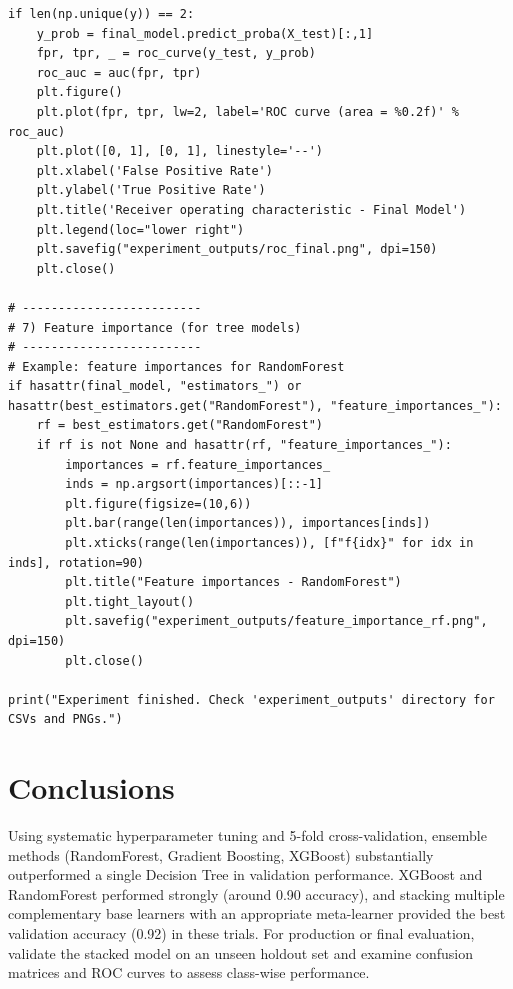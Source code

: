 \documentclass[11pt]{article}
\begin{document}
\begin{lstlisting}
if len(np.unique(y)) == 2:
    y_prob = final_model.predict_proba(X_test)[:,1]
    fpr, tpr, _ = roc_curve(y_test, y_prob)
    roc_auc = auc(fpr, tpr)
    plt.figure()
    plt.plot(fpr, tpr, lw=2, label='ROC curve (area = %0.2f)' % roc_auc)
    plt.plot([0, 1], [0, 1], linestyle='--')
    plt.xlabel('False Positive Rate')
    plt.ylabel('True Positive Rate')
    plt.title('Receiver operating characteristic - Final Model')
    plt.legend(loc="lower right")
    plt.savefig("experiment_outputs/roc_final.png", dpi=150)
    plt.close()

# -------------------------
# 7) Feature importance (for tree models)
# -------------------------
# Example: feature importances for RandomForest
if hasattr(final_model, "estimators_") or hasattr(best_estimators.get("RandomForest"), "feature_importances_"):
    rf = best_estimators.get("RandomForest")
    if rf is not None and hasattr(rf, "feature_importances_"):
        importances = rf.feature_importances_
        inds = np.argsort(importances)[::-1]
        plt.figure(figsize=(10,6))
        plt.bar(range(len(importances)), importances[inds])
        plt.xticks(range(len(importances)), [f"f{idx}" for idx in inds], rotation=90)
        plt.title("Feature importances - RandomForest")
        plt.tight_layout()
        plt.savefig("experiment_outputs/feature_importance_rf.png", dpi=150)
        plt.close()

print("Experiment finished. Check 'experiment_outputs' directory for CSVs and PNGs.")
\end{lstlisting}

\newpage



\section{Conclusions}
Using systematic hyperparameter tuning and 5-fold cross-validation, ensemble methods (RandomForest, Gradient Boosting, XGBoost) substantially outperformed a single Decision Tree in validation performance. XGBoost and RandomForest performed strongly (around 0.90 accuracy), and stacking multiple complementary base learners with an appropriate meta-learner provided the best validation accuracy (0.92) in these trials. For production or final evaluation, validate the stacked model on an unseen holdout set and examine confusion matrices and ROC curves to assess class-wise performance.
\end{document}
